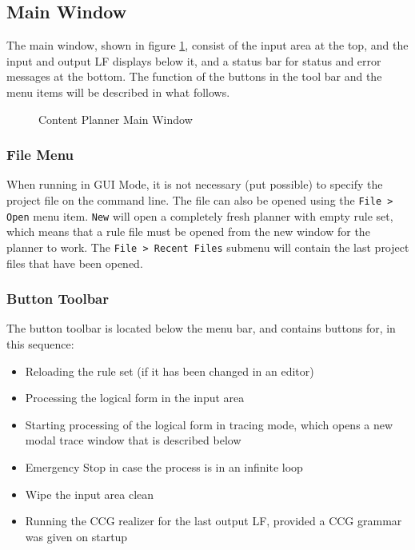 \documentclass[11pt,a4paper]{article}
\begin{document}
\subsection{Main Window}

The main window, shown in figure \ref{fig:mainwindow}, consist of the input
area at the top, and the input and output LF displays below it, and a status
bar for status and error messages at the bottom. The function of the buttons
in the tool bar and the menu items will be described in what follows.

\begin{figure}[htbp]
  \centering
  \caption{Content Planner Main Window}
  \label{fig:mainwindow}
\end{figure}

\subsubsection{File Menu}
When running in GUI Mode, it is not necessary (put possible) to specify the
project file on the command line. The file can also be opened using the
\texttt{File > Open} menu item. \texttt{New} will open a completely fresh
planner with empty rule set, which means that a rule file must be opened from
the new window for the planner to work. The \texttt{File > Recent Files}
submenu will contain the last project files that have been opened.

\subsubsection{Button Toolbar}
The button toolbar is located below the menu bar, and contains buttons for, in
this sequence:
\begin{itemize}\addtolength{\itemsep}{-.33\itemsep}
\item Reloading the rule set (if it has been changed in an editor)
\item Processing the logical form in the input area
\item Starting processing of the logical form in tracing mode, which opens a
  new modal trace window that is described below
\item Emergency Stop in case the process is in an infinite loop
\item Wipe the input area clean
\item Running the CCG realizer for the last output LF, provided a CCG
  grammar was given on startup
\end{itemize}
\end{document}
